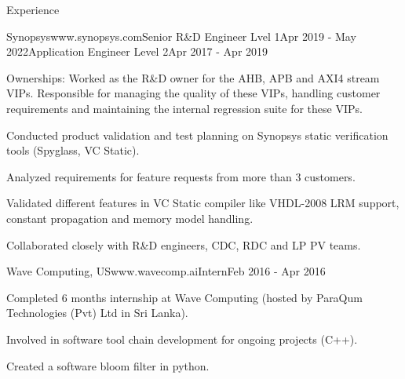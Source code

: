 \documentclass[
11pt, %
]{./assets/resume} %
\begin{document}
\begin{rSection}{Experience}
\begin{rSubsectionM}{Synopsys}{www.synopsys.com}{Senior R\&D Engineer Lvel 1}{Apr 2019 - May 2022}{Application Engineer Level 2}{Apr 2017 - Apr 2019}{}{}
		\item Ownerships: Worked as the R\&D owner for the AHB, APB and AXI4 stream VIPs. Responsible for managing the quality of these VIPs, handling customer requirements and maintaining the internal regression suite for these VIPs.
		\item Conducted product validation and test planning on Synopsys static verification tools (Spyglass, VC Static).
		\item Analyzed requirements for feature requests from more than 3 customers.
		\item Validated different features in VC Static compiler like VHDL-2008 LRM support, constant propagation and memory model handling.
		\item Collaborated closely with R\&D engineers, CDC, RDC and LP PV teams.
	\end{rSubsectionM}
	\begin{rSubsectionX}{Wave Computing, US}{www.wavecomp.ai}{Intern}{Feb 2016 - Apr 2016}
		\item Completed 6 months internship at Wave Computing (hosted by ParaQum Technologies (Pvt) Ltd in Sri Lanka).
		\item Involved in software tool chain development for ongoing projects (C++).
		\item Created a software bloom filter in python.
	\end{rSubsectionX}
	
\end{rSection}


	
\end{document}
